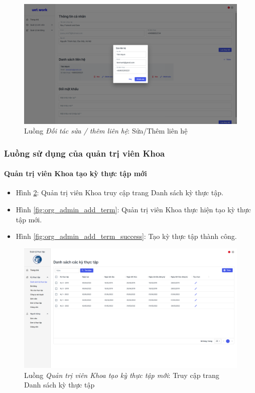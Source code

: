 \documentclass[./../main.tex]{subfiles}
\begin{document}
\begin{figure}[]
	\includegraphics[width=\linewidth]{./images/image88.png}
	\caption{Luồng \emph{Đối tác sửa / thêm liên hệ}: Sửa/Thêm liên hệ}
	\label{fig:partner_upsert_contact}
\end{figure}

\subsubsection{Luồng sử dụng của quản trị viên Khoa}

\paragraph*{Quản trị viên Khoa tạo kỳ thực tập mới}

\begin{itemize}
	\item Hình \ref{fig:org_admin_access_list_terms}: Quản trị viên Khoa truy cập trang Danh sách kỳ thực tập.
	\item Hình \ref{fig:org_admin_add_term}: Quản trị viên Khoa thực hiện tạo kỳ thực tập mới.
	\item Hình \ref{fig:org_admin_add_term_success}: Tạo kỳ thực tập thành công.
\end{itemize}

\begin{figure}[]
	\includegraphics[width=\linewidth]{./images/image53.png}
	\caption{Luồng \emph{Quản trị viên Khoa tạo kỳ thực tập mới}: Truy cập trang Danh sách kỳ thực tập}
	\label{fig:org_admin_access_list_terms}
\end{figure}
\end{document}
